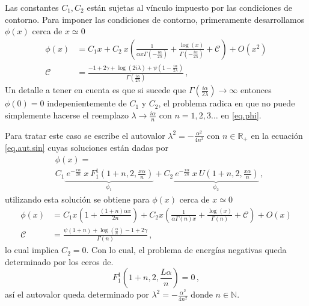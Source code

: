 Las constantes $C_1,C_2$ están sujetas al vínculo impuesto por las condiciones de contorno.
Para imponer las condiciones de contorno, primeramente desarrollamos $\phi (x)$ cerca de $x \simeq 0$ 
\begin{align}
\phi  ( x ) &=
C _1  x  + 
C _2 \ x 
\left( 
\frac{1}{  \alpha x  \Gamma ( - \frac{i \alpha}{2  \lambda}  )   }  +
\frac{\log (x) }{\Gamma ( - \frac{ i \alpha}{2 \lambda} ) } + \mathscr{C} \right) + O(x ^2)
	\nonumber
\\[10pt]
\mathscr{C} &= 
\frac{
-1 + 2 \gamma + \log ( 2  i \lambda ) + \psi (1 - \frac{i \alpha}{2 \lambda})
}
{\Gamma (\frac{i \alpha}{2 \lambda})}
\, ,
\label{eq.scat}
\end{align}
Un detalle a tener en cuenta es que si sucede que $\Gamma ( \frac{i \alpha}{2 \lambda}  ) \rightarrow \infty$ entonces $\phi (0) = 0$ indepenientemente de $C _1$ y $C _2$, el problema radica en que no puede simplemente hacerse el reemplazo $\lambda \rightarrow  \frac{i \alpha }{ n } $ con $n=1,2,3 \dots$ en \eqref{eq.phi}. 

Para tratar este caso se escribe el autovalor $\lambda ^2 = - \frac{\alpha ^2}{4 n ^2}$ con $n \in \mathbb{R _+}$ en la ecuación \eqref{eq.aut.sin} cuyas soluciones están dadas por
\begin{align}
& \nonumber 
	\phi (x)     =
\\ &        
	    C _1
    	\underbrace{
				     \ e ^{- \frac{x \alpha}{2n}} \ x \ 
				     F _{1} ^{1}
				     \left( 1+n,2, \frac{x \alpha}{n} \right) 
				     } _ {\phi_1} 				     
				     + 
      C _2 
      \underbrace{ 
      			   \ e^{- \frac{x \alpha}{2n}} \ x \ 
      			   U 
      			   \left( 1+n,2, \frac{x \alpha}{n} \right)
      			   } _{\phi_2} 
    \, ,
\label{eq.phi.2}
\end{align}
utilizando esta solución se obtiene para $\phi (x) $ cerca de $x \simeq 0$ 
\begin{align}
\nonumber
	\phi (x) 
&=
	C _1 x 
	\left(1 + \frac{(1+n) \alpha x}{2 n } \right)
	+ C _2 x
	\left(
	\frac{1}{\alpha \Gamma (n) x } + \frac{\log (x)}{\Gamma (n)} +\mathscr{C}
	\right)
	+ O(x)
\\
\mathscr{C} 
&=
\frac{\psi (1+n) + \log \left( \frac{\alpha}{n} \right) -1 + 2 \gamma}{\Gamma (n)}
\, ,
\end{align}
lo cual implica $C _2 = 0$. Con lo cual, el problema de energías negativas queda determinado por los ceros de.
\begin{equation}
	F _1 ^1 
	\left(
		1+n,2, \frac{L \alpha}{n}
		\right) = 0
\, ,		
\end{equation}
así el autovalor queda determinado por $\lambda ^2 = - \frac{\alpha ^2}{4 n ^2}$ donde \mbox{$n \in \mathbb{N}$}.


